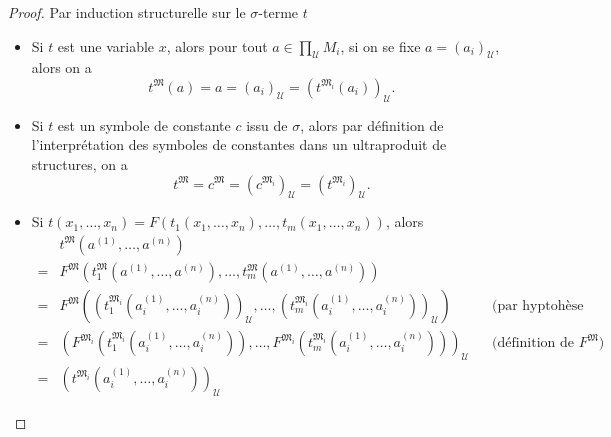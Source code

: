\begin{proof}
	Par induction structurelle sur le $\sigma$-terme $t$
	\begin{itemize}
		\item Si $t$ est une variable $x$, alors pour tout $a\in\prod_{\mathcal{U}}M_{i}$, si on se fixe $a=\left(a_{i}\right)_{\mathcal{U}}$, alors on a
		\[
			t^{\mathfrak{M}}\left(a\right)=a=\left(a_{i}\right)_{\mathcal{U}}=\left(t^{\mathfrak{M}_{i}}\left(a_{i}\right)\right)_{\mathcal{U}}.
		\]
		
		\item Si $t$ est un symbole de constante $c$ issu de $\sigma$, alors par définition de l'interprétation des symboles de constantes dans un ultraproduit de structures, on a
		\[
			t^{\mathfrak{M}}=c^{\mathfrak{M}}=\left(c^{\mathfrak{M}_{i}}\right)_{\mathcal{U}}=\left(t^{\mathfrak{M}_{i}}\right)_{\mathcal{U}}.
		\]
		
		\item Si $t\left(x_{1},\dots,x_{n}\right)=F\left(t_{1}\left(x_{1},\dots,x_{n}\right),\dots,t_{m}\left(x_{1},\dots,x_{n}\right)\right)$, alors
		\begin{align*}
			&t^{\mathfrak{M}}\left(a^{\left(1\right)},\dots,a^{\left(n\right)}\right)\\
			=&F^{\mathfrak{M}}\left(t_{1}^{\mathfrak{M}}\left(a^{\left(1\right)},\dots,a^{\left(n\right)}\right),\dots,t_{m}^{\mathfrak{M}}\left(a^{\left(1\right)},\dots,a^{\left(n\right)}\right)\right)\\
			=&F^{\mathfrak{M}}\left(\left(t_{1}^{\mathfrak{M}_{i}}\left(a_{i}^{\left(1\right)},\dots,a_{i}^{\left(n\right)}\right)\right)_{\mathcal{U}},\dots,\left(t_{m}^{\mathfrak{M}_{i}}\left(a_{i}^{\left(1\right)},\dots,a_{i}^{\left(n\right)}\right)\right)_{\mathcal{U}}\right)&&\text{(par hyptohèse d'induction)}\\
			=&\left(F^{\mathfrak{M}_{i}}\left(t_{1}^{\mathfrak{M}_{i}}\left(a_{i}^{\left(1\right)},\dots,a_{i}^{\left(n\right)}\right)\right),\dots,F^{\mathfrak{M}_{i}}\left(t_{m}^{\mathfrak{M}_{i}}\left(a_{i}^{\left(1\right)},\dots,a_{i}^{\left(n\right)}\right)\right)\right)_{\mathcal{U}}&&\text{(définition de $F^{\mathfrak{M}}$)}\\
			=&\left(t^{\mathfrak{M}_{i}}\left(a_{i}^{\left(1\right)},\dots,a_{i}^{\left(n\right)}\right)\right)_{\mathcal{U}}
		\end{align*}
	\end{itemize}
\end{proof}

